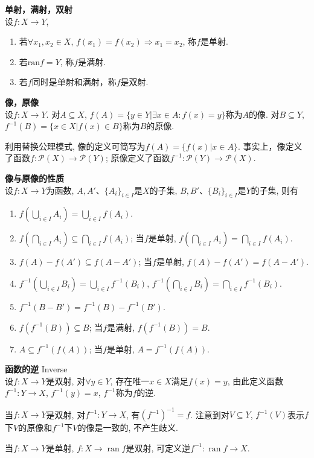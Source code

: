 \begin{dfn} \textbf{单射，满射，双射}\\
设$f:X\to Y$, 
\begin{enumerate}
    \item 若$\forall x_1,x_2 \in X$, $f(x_1)=f(x_2)\Rightarrow x_1=x_2$, 称$f$是单射.
    \item 若$\mathrm{ran}f=Y$, 称$f$是满射.
    \item 若$f$同时是单射和满射，称$f$是双射.
\end{enumerate} 
\end{dfn}

\begin{dfn} \textbf{像，原像} \\
设$f:X\to Y$. 对$A\subseteq X$, $f(A)=\{y\in Y\vert \exists x\in A: f(x)=y\}$称为$A$的像. 对$B\subseteq Y$, $f^{-1}(B)=\{x\in X\vert f(x)\in B\}$称为$B$的原像.
\end{dfn}
利用替换公理模式, 像的定义可简写为$f(A)=\{f(x)\vert x\in A\}$. 事实上，像定义了函数$f:\mathcal{P}(X)\to \mathcal{P}(Y)$; 原像定义了函数$f^{-1}:\mathcal{P}(Y)\to \mathcal{P}(X)$. 


\begin{pro}\textbf{像与原像的性质}\\
设$f:X\to Y$为函数, $A, A'$、$\{A_i\}_{i\in I}$是$X$的子集, $B, B'$、$\{B_i\}_{i\in I}$是$Y$的子集, 则有
\begin{enumerate}
\item $f(\bigcup_{i \in I}A_i)=\bigcup_{i \in I}f(A_i)$.
\item $f(\bigcap_{i \in I}A_i)\subseteq \bigcap_{i \in I}f(A_i)$; 当$f$是单射, $f(\bigcap_{i \in I}A_i)=\bigcap_{i \in I}f(A_i)$.
\item $f(A)-f(A')\subseteq f(A-A')$; 当$f$是单射, $f(A)-f(A')=f(A-A')$.
\item $f^{-1}(\bigcup_{i \in I}B_i)=\bigcup_{i \in I}f^{-1}(B_i)$, $f^{-1}(\bigcap_{i \in I}B_i)=\bigcap_{i \in I}f^{-1}(B_i)$.
\item $f^{-1}(B-B')=f^{-1}(B)-f^{-1}(B')$.
\item $f(f^{-1}(B))\subseteq B$; 当$f$是满射, $f(f^{-1}(B))=B$.
\item $A\subseteq f^{-1}(f(A))$; 当$f$是单射, $A=f^{-1}(f(A))$.

\end{enumerate}
\end{pro}

\begin{dfn} \textbf{函数的逆} Inverse\\
设$f:X \to Y$是双射, 对$\forall y\in Y$, 存在唯一$x\in X$满足$f(x)=y$, 由此定义函数 $f^{-1}:Y\to X$, $f^{-1}(y)=x$, $f^{-1}$称为$f$的逆. 
\end{dfn}
\par 当$f:X \to Y$是双射, 对$f^{-1}:Y\to X$, 有$(f^{-1})^{-1}=f$. 注意到对$V\subseteq Y$, $f^{-1}(V)$表示$f$下$V$的原像和$f^{-1}$下$V$的像是一致的, 不产生歧义. 
\par 当$f:X \to Y$是单射, $f:X\to \operatorname{ran}f$是双射, 可定义逆$f^{-1}:\operatorname{ran}f\to X$. 

